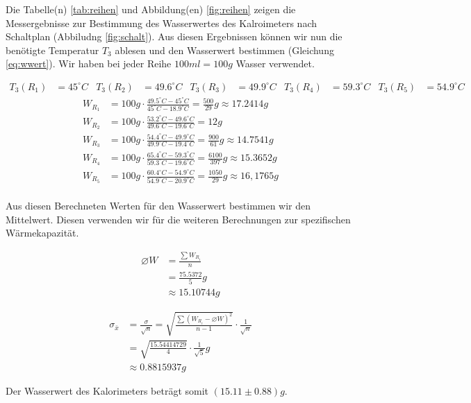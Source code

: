 \documentclass[10pt,a4paper]{article}
\begin{document}
\begin{flushleft}
Die Tabelle(n) \ref{tab:reihen} und Abbildung(en) \ref{fig:reihen} zeigen die Messergebnisse zur Bestimmung des Wasserwertes des Kalroimeters nach Schaltplan (Abbiludng \ref{fig:schalt}). Aus diesen Ergebnissen können wir nun die benötigte Temperatur $T_3$ ablesen und den Wasserwert bestimmen (Gleichung \ref{eq:wwert}). Wir haben bei jeder Reihe $100ml = 100g$ Wasser verwendet.
\end{flushleft}
\begin{align*}
T_3(R_1) &= 45^{\circ}C & T_3(R_2) &= 49.6^{\circ}C & T_3(R_3) &= 49.9^{\circ}C & T_3(R_4) &= 59.3^{\circ}C & T_3(R_5) &= 54.9^{\circ}C
\end{align*}
\begin{align*}
W_{R_1} &= 100g \cdot \frac{49.5^{\circ}C - 45^{\circ}C}{45^{\circ}C - 18.9^{\circ}C} = \frac{500}{29}g \approx 17.2414g \\
W_{R_2} &= 100g \cdot \frac{53.2^{\circ}C - 49.6^{\circ}C}{49.6^{\circ}C - 19.6^{\circ}C} = 12g \\
W_{R_3} &= 100g \cdot \frac{54.4^{\circ}C - 49.9^{\circ}C}{49.9^{\circ}C - 19.4^{\circ}C} = \frac{900}{61}g \approx 14.7541g \\
W_{R_4} &= 100g \cdot \frac{65.4^{\circ}C - 59.3^{\circ}C}{59.3^{\circ}C - 19.6^{\circ}C} = \frac{6100}{397}g \approx 15.3652g \\
W_{R_5} &= 100g \cdot \frac{60.4^{\circ}C - 54.9^{\circ}C}{54.9^{\circ}C - 20.9^{\circ}C} = \frac{1050}{29}g \approx 16,1765g \\
\end{align*}
\begin{flushleft}
Aus diesen Berechneten Werten für den Wasserwert bestimmen wir den Mittelwert. Diesen verwenden wir für die weiteren Berechnungen zur spezifischen Wärmekapazität.
\end{flushleft}
\begin{figure}[H]
\centering
\begin{subfigure}[t]{.5\textwidth}
\centering
\begin{align*}
\varnothing W &= \frac{\sum W_{R_i}}{n} \\
&= \frac{75.5372}{5}g \\
&\approx 15.10744g
\end{align*}
\end{subfigure}%
%
\begin{subfigure}[t]{.5\textwidth}
\centering
\begin{align*}
\sigma_{\bar{x}} &= \frac{\sigma}{\sqrt{n}} = \sqrt{\frac{\sum(W_{R_i} - \varnothing W)^2}{n-1}} \cdot \frac{1}{\sqrt{n}} \\
&= \sqrt{\frac{15.54414729}{4}} \cdot \frac{1}{\sqrt{5}}g \\
&\approx 0.8815937g
\end{align*}
\end{subfigure}%
\end{figure}
\begin{flushleft}
Der Wasserwert des Kalorimeters beträgt somit $(15.11 \pm 0.88)g$.
\end{flushleft}
\end{document}
